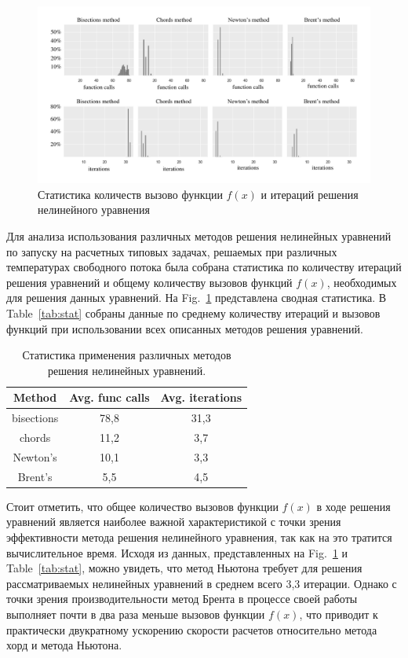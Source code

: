 \documentclass[
11pt,%
tightenlines,%
twoside,%
onecolumn,%
nofloats,%
nobibnotes,%
nofootinbib,%
superscriptaddress,%
noshowpacs,%
centertags]%
{revtex4}
\begin{document}
\begin{figure}[h!]
\setcaptionmargin{5mm}
\onelinecaptionstrue
\includegraphics[width=1\textwidth]{pics/stat.pdf}
\caption{Статистика количеств вызово функции $f(x)$ и итераций решения нелинейного уравнения}\label{fig:stat}
\end{figure}

Для анализа использования различных методов решения нелинейных уравнений по запуску на расчетных типовых задачах, решаемых при различных температурах свободного потока была собрана статистика по количеству итераций решения уравнений и общему количеству вызовов функций $f(x)$, необходимых для решения данных уравнений.
На Fig.~\ref{fig:stat} представлена сводная статистика.
В Table~\ref{tab:stat} собраны данные по среднему количеству итераций и вызовов функций при использовании всех описанных методов решения уравнений.

\begin{table}[h!]
\label{tbl:supercomputers}
\setcaptionmargin{0mm}
\onelinecaptionsfalse
{}
\caption{Статистика применения различных методов решения нелинейных уравнений.}\label{tab:stat}
\bigskip
\begin{tabular}{|c|c|c|}
\hline
Method & Avg. func calls & Avg. iterations \\
\hline
bisections & 78,8 & 31,3 \\
\hline
chords & 11,2 & 3,7 \\
\hline
Newton's & 10,1 & 3,3 \\
\hline
Brent's & 5,5 & 4,5 \\
\hline
\end{tabular}
\label{tab:supercomputers}
\end{table}

Стоит отметить, что общее количество вызовов функции $f(x)$ в ходе решения уравнений является наиболее важной характеристикой с точки зрения эффективности метода решения нелинейного уравнения, так как на это тратится вычислительное время.
Исходя из данных, представленных на Fig.~\ref{fig:stat} и Table~\ref{tab:stat}, можно увидеть, что метод Ньютона требует для решения рассматриваемых нелинейных уравнений в среднем всего 3,3 итерации.
Однако с точки зрения производительности метод Брента в процессе своей работы выполняет почти в два раза меньше вызовов функции $f(x)$, что приводит к практически двукратному ускорению скорости расчетов относительно метода хорд и метода Ньютона.
\end{document}
